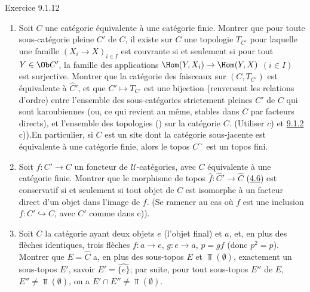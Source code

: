 \begin{enonce*}[remark]{Exercice 9.1.12}
\begin{enumerate}
\item Soit $C$ une catégorie équivalente à une catégorie
finie. Montrer que pour toute sous-catégorie pleine $C'$ de $C$, il
existe sur $C$ une topologie $T_{C'}$ pour laquelle une famille
$(X_i\rightarrow X)_{i\in I}$ est couvrante si et seulement si pour
tout $Y\in \Ob C'$, la famille des applications
$\Hom(Y,X_i)\rightarrow \Hom(Y,X)$ $(i\in I)$ est surjective.
Montrer que la catégorie des faisceaux sur $(C,T_{C'})$ est
équivalente à $\widehat{C}'$, et que $C'\mapsto T_{C'}$ est une
bijection (renversant les relations d'ordre) entre l'ensemble des
sous-catégories strictement pleines $C'$ de $C$ qui sont
karoubiennes (ou, ce qui revient au même, stables dans $C$ par
facteurs directs), et l'ensemble des topologies ()
sur la catégorie $C$. (Utiliser $c$) et \hyperref[IV.rem9.1.2]{9.1.2}
c)).\pageoriginale En particulier, si $C$ est un site dont la
catégorie sous-jacente est équivalente à une catégorie finie, alors
le topos $C^{\sim}$ est un topos fini.

\item Soit $f:C'\rightarrow C$ un foncteur de $𝒰$-catégories, avec
$C$ équivalente à une catégorie finie. Montrer que le morphisme de
topos $\widehat{f}:\widehat{C}'\rightarrow \widehat{C}$
(\hyperref[IV.subsec4.6]{4.6}) est conservatif si et seulement si tout objet
de $C$ est isomorphe à un facteur direct d'un objet dans l'image de
$f$. (Se ramener au cas où $f$ est une inclusion
$f:C'\hookrightarrow C$, avec $C'$ comme dans c)).

\item Soit $C$ la catégorie ayant deux objets $e$ (l'objet final) et
$a$, et, en plus des flèches identiques, trois flèches
$f:a\rightarrow e$, $g:e\rightarrow a$, $p=gf$ (donc $p^2=p$).
Montrer que $E=\widehat{C}$ a, en plus des sous-topos $E$ et
$\Top(∅)$, exactement un sous-topos $E'$, savoir
$E'=\widehat{\{e\}}$; par suite, pour tout sous-topos $E''$ de $E$,
$E''\neq \Top(∅)$, on a $E'\cap E''\neq \Top(∅)$.
\end{enumerate}
\end{enonce*}

